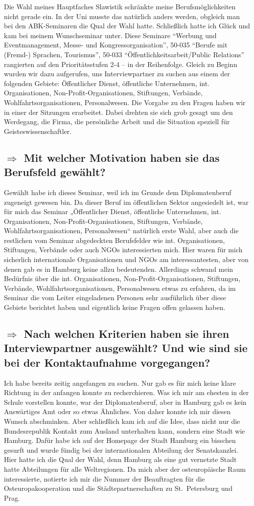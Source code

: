 \documentclass[12pt,headsepline,a4paper]{scrartcl}
\newcommand\quest[1]{\subsection*{$\Rightarrow$ #1}}
\begin{document}
Die Wahl meines Hauptfaches Slawistik schränkte meine Berufsmöglichkeiten nicht gerade ein. In der Uni musste das natürlich anders werden, obgleich man bei den ABK-Seminaren die Qual der Wahl hatte. Schließlich hatte ich Glück und kam bei meinem Wunschseminar unter. Diese Seminare ``Werbung und Eventmanagement, Messe- und Kongressorganisation'', 50-035 ``Berufe mit (Fremd-) Sprachen, Tourismus'', 50-033 ``Öffentlichkeitsarbeit/Public Relations'' rangierten auf den Prioritätsstufen 2-4 -- in der Reihenfolge. 
Gleich zu Beginn wurden wir dazu aufgerufen, uns Interviewpartner zu suchen aus einem der folgenden Gebiete: Öffentlicher Dienst, öffentliche Unternehmen, int. Organisationen, Non-Profit-Organisationen, Stiftungen, Verbände, Wohlfahrtsorganisationen, Personalwesen. 
Die Vorgabe zu den Fragen haben wir in einer der Sitzungen erarbeitet. Dabei drehten  sie sich grob gesagt um den Werdegang, die Firma, die persönliche Arbeit und die Situation speziell für Geisteswissenschaftler.

\quest{Mit welcher Motivation haben sie das Berufsfeld gewählt?}
Gewählt habe ich dieses Seminar, weil ich im Grunde dem  Diplomatenberuf zugeneigt gewesen bin. Da dieser Beruf im öffentlichen Sektor angesiedelt ist, war für mich das Seminar „Öffentlicher Dienst, öffentliche Unternehmen, int. Organisationen, 
Non-Profit-Organisationen, Stiftungen, Verbände, Wohlfahrtsorganisationen, Personalwesen“ natürlich erste Wahl, aber auch die restlichen vom Seminar abgedeckten Berufsfelder wie int. Organisationen, Stiftungen, Verbände oder auch NGOs interessierten mich. Hier waren für mich sicherlich internationale Organisationen und NGOs am interessantesten, aber von denen gab es in Hamburg keine allzu bedeutenden.
Allerdings schwand mein Bedürfnis über die int. Organisationen, 
Non-Profit-Organisationen, Stiftungen, Verbände, Wohlfahrtsorganisationen, Personalwesen etwas zu erfahren, da im Seminar die vom Leiter eingeladenen Personen sehr ausführlich über diese Gebiete berichtet haben und eigentlich keine Fragen offen gelassen haben. 

\quest{Nach welchen Kriterien haben sie ihren Interviewpartner ausgewählt? Und wie sind sie bei der Kontaktaufnahme vorgegangen?}
Ich habe bereits zeitig angefangen zu suchen. Nur gab es für mich keine klare Richtung in der anfangen konnte zu recherchieren. Was ich mir am ehesten in der Schule vorstellen konnte, war der Diplomatenberuf, aber in Hamburg gab es kein Auswärtiges Amt oder so etwas Ähnliches. Von daher konnte ich mir diesen Wunsch abschminken. Aber schließlich kam ich auf die Idee, dass nicht nur die Bundesrepublik Kontakt zum Ausland unterhalten kann, sondern eine Stadt wie Hamburg. Dafür habe ich auf der Homepage der Stadt Hamburg  ein bisschen gesurft und wurde fündig bei der internationalen Abteilung der Senatskanzlei. Hier hatte ich die Qual der Wahl, denn Hamburg als eine gut vernetzte Stadt hatte Abteilungen für alle Weltregionen.
Da mich aber der osteuropäische Raum interessierte, notierte ich mir die Nummer der Beauftragten für die Osteuropakooperation und die Städtepartnerschaften zu St.\ Petersburg und Prag.
\end{document}
